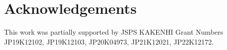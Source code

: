 \section*{Acknowledgements}
This work was partially supported by JSPS KAKENHI Grant Numbers {\color{red} JP19K12102, JP19K12103}, JP20K04973, JP21K12021, JP22K12172. 
